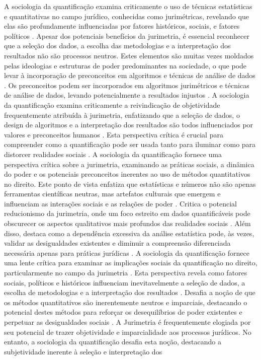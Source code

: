 \begin{agradecimentos}
    A sociologia da quantificação examina criticamente o uso de técnicas estatísticas e quantitativas no campo jurídico, conhecidas como jurimétricas, revelando que elas são profundamente influenciadas por fatores históricos, sociais, e fatores políticos \cite{johnson2022}. Apesar dos potenciais benefícios da jurimetria, é essencial reconhecer que a seleção dos dados, a escolha das metodologias e a interpretação dos resultados não são processos neutros. Estes elementos são muitas vezes moldados pelas ideologias e estruturas de poder predominantes na sociedade, o que pode levar à incorporação de preconceitos em algoritmos e técnicas de análise de dados \cite{smith2021}. Os preconceitos podem ser incorporados em algoritmos jurimétricos e técnicas de análise de dados, levando potencialmente a resultados injustos \cite{10.1057/s41599-020-00557-0,de2010jurimetrics}. A sociologia da quantificação examina criticamente a reivindicação de objetividade frequentemente atribuída à jurimetria, enfatizando que a seleção de dados, o design de algoritmos e a interpretação dos resultados são todos influenciados por valores e preconceitos humanos \cite{10.1057/s41599-020-00557 -0,de2010jurimetria}. Esta perspectiva crítica é crucial para compreender como a quantificação pode ser usada tanto para iluminar como para distorcer realidades sociais \cite{10.1057/s41599-020-00557-0,de2010jurimetrics}. A sociologia da quantificação fornece uma perspectiva crítica sobre a jurimetria, examinando as práticas sociais, a dinâmica do poder e os potenciais preconceitos inerentes ao uso de métodos quantitativos no direito. Este ponto de vista enfatiza que estatísticas e números não são apenas ferramentas científicas neutras, mas artefatos culturais que emergem e influenciam as interações sociais e as relações de poder \cite{10.1057/s41599-020-00557-0,de2010jurimetrics}. Critica o potencial reducionismo da jurimetria, onde um foco estreito em dados quantificáveis pode obscurecer os aspectos qualitativos mais profundos das realidades sociais \cite{10.1057/s41599-020-00557-0,de2010jurimetrics}. Além disso, destaca como a dependência excessiva da análise estatística pode, às vezes, validar as desigualdades existentes e diminuir a compreensão diferenciada necessária apenas para práticas jurídicas \cite{10.1057/s41599-020-00557-0,de2010jurimetrics}. A sociologia da quantificação fornece uma lente crítica para examinar as implicações sociais da quantificação no direito, particularmente no campo da jurimetria \cite{10.1057/s41599-020-00557-0,de2010jurimetrics}. Esta perspectiva revela como fatores sociais, políticos e históricos influenciam inevitavelmente a seleção de dados, a escolha de metodologias e a interpretação dos resultados \cite{10.1057/s41599-020-00557-0,de2010jurimetrics}. Desafia a noção de que os métodos quantitativos são inerentemente neutros e imparciais, destacando o potencial destes métodos para reforçar os desequilíbrios de poder existentes e perpetuar as desigualdades sociais \cite{10.1057/s41599-020-00557-0,de2010jurimetrics}. A Jurimetria é frequentemente elogiada por seu potencial de trazer objetividade e imparcialidade aos processos jurídicos. No entanto, a sociologia da quantificação desafia esta noção, destacando a subjetividade inerente à seleção e interpretação dos 
\end{agradecimentos}
